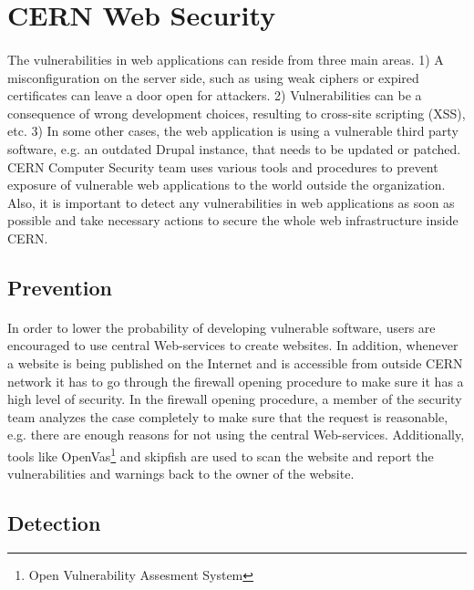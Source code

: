 \section{CERN Web Security}
\paragraph{}
The vulnerabilities in web applications can reside from three main areas. 1) A misconfiguration on the server side, such as using weak ciphers or expired certificates can leave a door open for attackers. 2) Vulnerabilities can be a consequence of wrong development choices, resulting to cross-site scripting (XSS), etc. 3) In some other cases, the web application is using a vulnerable third party software, e.g. an outdated Drupal instance, that needs to be updated or patched. CERN Computer Security team uses various tools and procedures to prevent exposure of vulnerable web applications to the world outside the organization. Also, it is important to detect any vulnerabilities in web applications as soon as possible and take necessary actions to secure the whole web infrastructure inside CERN.

\subsection{Prevention}
\paragraph{}
In order to lower the probability of developing vulnerable software, users are encouraged to use central Web-services to create websites. In addition, whenever a website is being published on the Internet and is accessible from outside CERN network it has to go through the firewall opening procedure to make sure it has a high level of security. In the firewall opening procedure, a member of the security team analyzes the case completely to make sure that the request is reasonable, e.g. there are enough reasons for not using the central Web-services. Additionally, tools like OpenVas\footnote{Open Vulnerability Assesment System} and skipfish are used to scan the website and report the vulnerabilities and warnings back to the owner of the website. 

\subsection{Detection}
